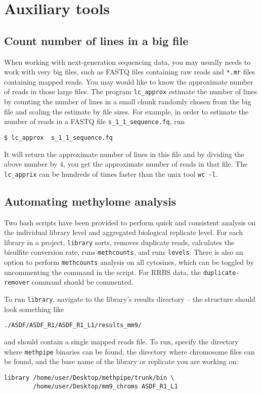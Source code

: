\documentclass[10pt]{article}
\newcommand{\prog}[1]{\texttt{#1}}
\newcommand{\fn}[1]{\texttt{#1}}
\begin{document}
\section{Auxiliary tools}
\label{sec:auxiliary-tools}

\subsection{Count number of lines in a big file}
\label{sec:count-number-lines}

When working with next-generation sequencing data, you may usually
needs to work with very big files, such as FASTQ files containing raw
reads and \fn{*.mr} files containing mapped reads. You may would like
to know the approximate number of reads in those large files. The
program \prog{lc\_approx} estimate the number of lines by counting the
number of lines in a small chunk randomly chosen from the big file and
scaling the estimate by file sizes. For example, in order to estimate
the number of reads in a FASTQ file \fn{s\_1\_1\_sequence.fq}, run
\begin{verbatim}
$ lc_approx  s_1_1_sequence.fq
\end{verbatim}
It will return the approximate number of lines in this file and by
dividing the above number by 4, you get the approximate number of
reads in that file. The \prog{lc\_apprix} can be hundreds of times
faster than the unix tool \prog{wc -l}.

\subsection{Automating methylome analysis}
\label{sec:automate-library-level}
Two bash scripts have been provided to perform quick and consistent analysis
on the individual library level and aggregated biological replicate level.
For each library in a project, \prog{library} sorts, removes duplicate
reads, calculates the bisulfite conversion rate, runs \prog{methcounts}, and
runs \prog{levels}. There is also an option to perform \prog{methcounts}
analysis on all cytosines, which can be toggled by uncommenting the command
in the script. For RRBS data, the \prog{duplicate-remover} command should
be commented.

To run \prog{library}, navigate to the library's results directory --
the structure should look something like
\begin{verbatim}
./ASDF/ASDF_R1/ASDF_R1_L1/results_mm9/
\end{verbatim}
and should contain a single mapped reads file. To run, specify the directory
where \prog{methpipe} binaries can be found, the directory where chromosome
files can be found, and the base name of the library or replicate you are
working on:
\begin{verbatim}
library /home/user/Desktop/methpipe/trunk/bin \
        /home/user/Desktop/mm9_chroms ASDF_R1_L1
\end{verbatim}
\end{document}
